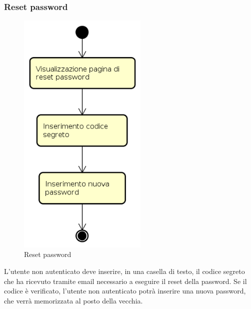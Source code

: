 \subsubsection{Reset password}
\begin{figure}[H]
\begin{center}
\includegraphics[height=12cm]{res/sections/backend/activities/resetPassword.png}
\caption{Reset password}
\end{center}
\end{figure}
L'utente non autenticato deve inserire, in una casella di testo, il codice segreto che ha ricevuto tramite email necessario a eseguire il reset della password. Se il codice è verificato, l'utente non autenticato potrà inserire una nuova password, che verrà memorizzata al posto della vecchia.
